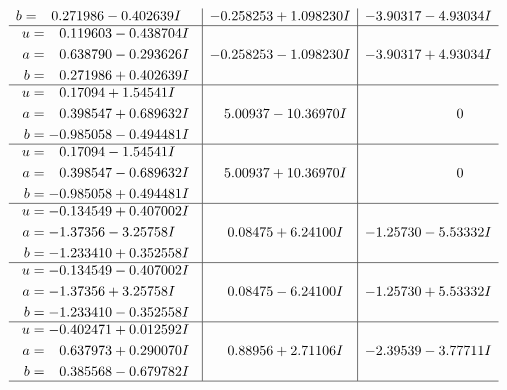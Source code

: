 \documentclass[1p]{elsarticle_modified}
\theoremstyle{definition}
\begin{document}
$$\begin{array}{c|c|c}
\begin{aligned}
b &= \phantom{-}0.271986 - 0.402639 I\end{aligned}
 & -0.258253 + 1.098230 I & -3.90317 - 4.93034 I \\ \hline\begin{aligned}
u &= \phantom{-}0.119603 - 0.438704 I \\
a &= \phantom{-}0.638790 - 0.293626 I \\
b &= \phantom{-}0.271986 + 0.402639 I\end{aligned}
 & -0.258253 - 1.098230 I & -3.90317 + 4.93034 I \\ \hline\begin{aligned}
u &= \phantom{-}0.17094 + 1.54541 I \\
a &= \phantom{-}0.398547 + 0.689632 I \\
b &= -0.985058 - 0.494481 I\end{aligned}
 & \phantom{-}5.00937 - 10.36970 I & \phantom{-0.000000 } 0 \\ \hline\begin{aligned}
u &= \phantom{-}0.17094 - 1.54541 I \\
a &= \phantom{-}0.398547 - 0.689632 I \\
b &= -0.985058 + 0.494481 I\end{aligned}
 & \phantom{-}5.00937 + 10.36970 I & \phantom{-0.000000 } 0 \\ \hline\begin{aligned}
u &= -0.134549 + 0.407002 I \\
a &= -1.37356 - 3.25758 I \\
b &= -1.233410 + 0.352558 I\end{aligned}
 & \phantom{-}0.08475 + 6.24100 I & -1.25730 - 5.53332 I \\ \hline\begin{aligned}
u &= -0.134549 - 0.407002 I \\
a &= -1.37356 + 3.25758 I \\
b &= -1.233410 - 0.352558 I\end{aligned}
 & \phantom{-}0.08475 - 6.24100 I & -1.25730 + 5.53332 I \\ \hline\begin{aligned}
u &= -0.402471 + 0.012592 I \\
a &= \phantom{-}0.637973 + 0.290070 I \\
b &= \phantom{-}0.385568 - 0.679782 I\end{aligned}
 & \phantom{-}0.88956 + 2.71106 I & -2.39539 - 3.77711 I\\
 \hline 
 \end{array}$$\newpage$$\begin{array}{c|c|c}  

\end{array}$$
\end{document}
